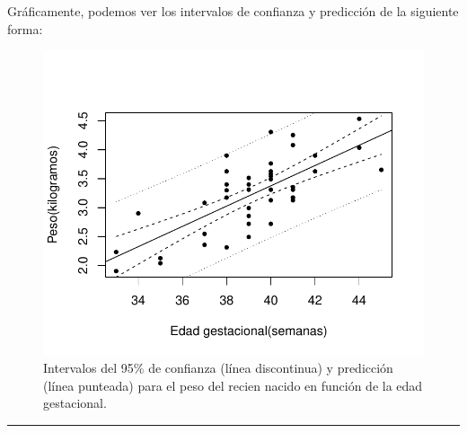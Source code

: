 \documentclass[
]{article}
\newenvironment{Shaded}{\begin{snugshade}}{\end{snugshade}}
\newcommand{\AttributeTok}[1]{\textcolor[rgb]{0.77,0.63,0.00}{#1}}
\newcommand{\DecValTok}[1]{\textcolor[rgb]{0.00,0.00,0.81}{#1}}
\newcommand{\FunctionTok}[1]{\textcolor[rgb]{0.00,0.00,0.00}{#1}}
\newcommand{\NormalTok}[1]{#1}
\newcommand{\SpecialCharTok}[1]{\textcolor[rgb]{0.00,0.00,0.00}{#1}}
\newcommand{\StringTok}[1]{\textcolor[rgb]{0.31,0.60,0.02}{#1}}
\begin{document}
Gráficamente, podemos ver los intervalos de confianza y predicción de la siguiente forma:

\begin{Shaded}
\end{Shaded}

\begin{figure}

{\centering \includegraphics{MLGI_files/figure-latex/birthweightIC-1} 

}

\caption{\label{fig:BWdata2} Intervalos del 95\% de confianza (línea discontinua) y predicción (línea punteada) para el peso del recien nacido en función de la edad gestacional.}\label{fig:birthweightIC}
\end{figure}
\rule{\textwidth}{0.4pt}
\end{document}
